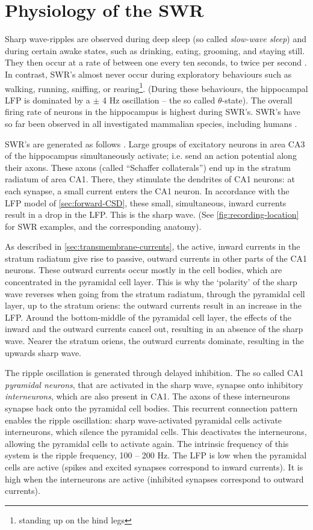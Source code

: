 \section{Physiology of the SWR}
\label{sec:physiology}

Sharp wave-ripples are observed during deep sleep (so called \emph{slow-wave sleep}) and during certain awake states, such as drinking, eating, grooming, and staying still. They then occur at a rate of between one every ten seconds, to twice per second \cite{Girardeau2011}. In contrast, SWR's almost never occur during exploratory behaviours such as walking, running, sniffing, or rearing\footnote{standing up on the hind legs}. (During these behaviours, the hippocampal LFP is dominated by a $\pm$ 4 Hz oscillation -- the so called $\theta$-state). The overall firing rate of neurons in the hippocampus is highest during SWR's. SWR's have so far been observed in all investigated mammalian species, including humans \cite{Buzsaki2015}.

SWR's are generated as follows \cite{Girardeau2011,Buzsaki2015}. Large groups of excitatory neurons in area CA3 of the hippocampus simultaneously activate; i.e. send an action potential along their axons. These axons (called ``Schaffer collaterals'') end up in the stratum radiatum of area CA1. There, they stimulate the dendrites of CA1 neurons: at each synapse, a small current enters the CA1 neuron. In accordance with the LFP model of \cref{sec:forward-CSD}, these small, simultaneous, inward currents result in a drop in the LFP. This is the sharp wave. (See \cref{fig:recording-location} for SWR examples, and the corresponding anatomy).

As described in \cref{sec:transmembrane-currents}, the active, inward currents in the stratum radiatum give rise to passive, outward currents in other parts of the CA1 neurons. These outward currents occur mostly in the cell bodies, which are concentrated in the pyramidal cell layer. This is why the `polarity' of the sharp wave reverses when going from the stratum radiatum, through the pyramidal cell layer, up to the stratum oriens: the outward currents result in an increase in the LFP. Around the bottom-middle of the pyramidal cell layer, the effects of the inward and the outward currents cancel out, resulting in an absence of the sharp wave. Nearer the stratum oriens, the outward currents dominate, resulting in the upwards sharp wave.

The ripple oscillation is generated through delayed inhibition. The so called CA1 \emph{pyramidal neurons}, that are activated in the sharp wave, synapse onto inhibitory \emph{interneurons}, which are also present in CA1. The axons of these interneurons synapse back onto the pyramidal cell bodies. This recurrent connection pattern enables the ripple oscillation: sharp wave-activated pyramidal cells activate interneurons, which silence the pyramidal cells. This deactivates the interneurons, allowing the pyramidal cells to activate again. The intrinsic frequency of this system is the ripple frequency, 100 -- 200 Hz. The LFP is low when the pyramidal cells are active (spikes and excited synapses correspond to inward currents). It is high when the interneurons are active (inhibited synapses correspond to outward currents).
